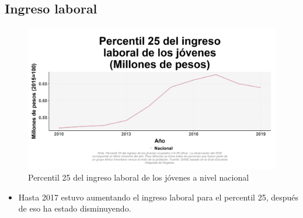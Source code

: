     \subsection{Ingreso laboral}

    \begin{figure}[H]
        \caption{Percentil 25 del ingreso laboral de los jóvenes a nivel nacional \label{map_result_2} }
        \begin{center}
        \includegraphics[width=\textwidth,keepaspectratio]{img/var_13_trend.png}
        \end{center}
    \end{figure}
            \begin{itemize}
                \item Hasta 2017 estuvo aumentando el ingreso laboral para el percentil 25, después de eso ha estado disminuyendo.
                \end{itemize}

